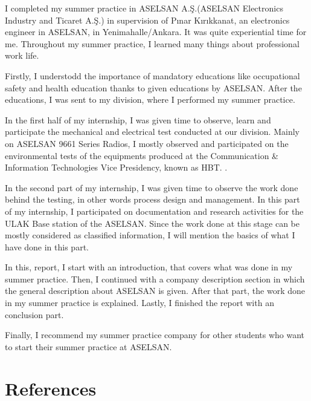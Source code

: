 \-
\indent I completed my summer practice in ASELSAN A.Ş.(ASELSAN Electronics Industry and Ticaret A.Ş.) in supervision of Pınar Kırıkkanat, an electronics engineer in ASELSAN, in Yenimahalle/Ankara. It was quite experiential time for me. Throughout my summer practice, I learned many things about professional work life. 

	Firstly, I understodd the importance of mandatory educations like occupational safety and health education thanks to given educations by ASELSAN. After the educations, I was  sent to my division, where I performed my summer practice.
	
	In the first half of my internship, I was given time to observe, learn and participate the mechanical and electrical test conducted at our division. Mainly on ASELSAN 9661 Series Radios, I mostly observed and participated on the environmental tests of the equipments produced at the Communication \& Information Technologies Vice Presidency, known as HBT. .
	
	In the second part of my internship, I was given time to observe the work done behind the testing, in other words process design and management. In this part of my internship, I participated on documentation and research activities for the ULAK Base station of the ASELSAN. Since the work done at this stage can be mostly considered as classified information, I will mention the basics of what I have done in this part.
	
	In this, report, I start with an introduction, that covers what was done in my summer practice. Then, I continued with a company description section in which the general description about ASELSAN is given. After that part, the work done in my summer practice is explained. Lastly, I finished the report with an conclusion part. 
		
	
	Finally, I recommend my summer practice company for other students who want to start their summer practice at ASELSAN. 

\-\vfill 


\section{References}


